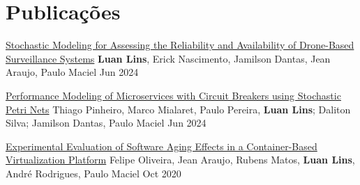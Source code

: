 \section{Publicações}
\resumeSubHeadingListStart

\resumePubliSubheading
{\href{https://doi.org/10.1109/SysCon61195.2024.10553470}{Stochastic Modeling for Assessing the Reliability and Availability of Drone-Based Surveillance Systems}}
{\textbf{Luan Lins}, Erick Nascimento, Jamilson Dantas, Jean Araujo, Paulo Maciel}
{Jun 2024}

\resumePubliSubheading
{\href{https://doi.org/10.1109/SysCon61195.2024.10553490}{Performance Modeling of Microservices with Circuit Breakers using Stochastic Petri Nets}}
{Thiago Pinheiro, Marco Mialaret, Paulo Pereira, \textbf{Luan Lins}; Daliton Silva; Jamilson Dantas, Paulo Maciel}
{Jun 2024}


\resumePubliSubheading
{\href{https://doi.org/10.1109/SMC42975.2020.9283358}{Experimental Evaluation of Software Aging Effects in a Container-Based Virtualization Platform}}
{Felipe Oliveira, Jean Araujo, Rubens Matos, \textbf{Luan Lins}, André Rodrigues, Paulo Maciel}
{Oct 2020}


\resumeSubHeadingListEnd